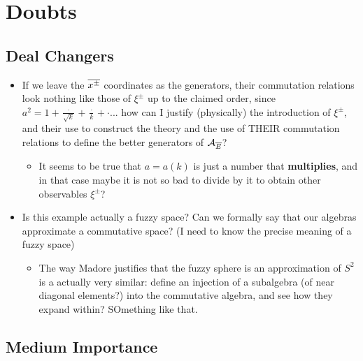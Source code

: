 \section{Doubts}

\subsection{Deal Changers}

    \begin{itemize}
    
    \item If we leave the $\overline{x^\pm}$ coordinates as the generators, their commutation relations look nothing like those of $\xi^\pm$ up to the claimed order, since $a^2 = 1 + \frac{\cdot}{\sqrt{k}} + \frac{\cdot}{k} + \cdot$... how can I justify (physically) the introduction of $\xi^\pm$, and their use to construct the theory and the use of THEIR commutation relations to define the better generators of $\mathcal A_{\overline{E}}$?
    
        \begin{itemize}
            
        \item It seems to be true that $a = a(k)$ is just a number that \textbf{multiplies}, and in that case maybe it is not so bad to divide by it to obtain other observables $\xi^\pm$?
            
        \end{itemize}
    
    \item Is this example actually a fuzzy space? Can we formally say that our algebras approximate a commutative space? (I need to know the precise meaning of a fuzzy space)
    
        \begin{itemize}
            
        \item The way Madore justifies that the fuzzy sphere is an approximation of $S^2$ is a actually very similar: define an injection of a subalgebra (of near diagonal elements?) into the commutative algebra, and see how they expand within? SOmething like that.
            
        \end{itemize}
    
    \end{itemize}

\subsection{Medium Importance}

